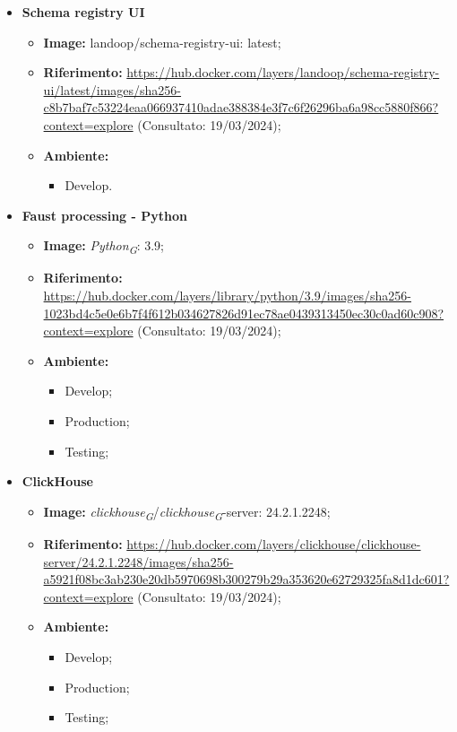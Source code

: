 \begin{itemize}
  \item \textbf{Schema registry UI} 
    \begin{itemize}
      \item \textbf{Image:} landoop/schema-registry-ui: latest;
      \item \textbf{Riferimento:} \url{https://hub.docker.com/layers/landoop/schema-registry-ui/latest/images/sha256-c8b7baf7c53224eaa066937410adae388384e3f7c6f26296ba6a98cc5880f866?context=explore} (Consultato: 19/03/2024);
      \item \textbf{Ambiente:}
        \begin{itemize}
          \item Develop.
        \end{itemize}
    \end{itemize}

  \item \textbf{Faust processing - Python} 
    \begin{itemize}
      \item \textbf{Image:} \textit{Python}\textsubscript{\textit{G}}: 3.9;
      \item \textbf{Riferimento:} \url{https://hub.docker.com/layers/library/python/3.9/images/sha256-1023bd4c5e0e6b7f4f612b034627826d91ec78ae0439313450ec30c0ad60c908?context=explore} (Consultato: 19/03/2024);
      \item \textbf{Ambiente:}
        \begin{itemize}
          \item Develop;
          \item Production;
          \item Testing;
        \end{itemize}
    \end{itemize}

  \item \textbf{ClickHouse} 
    \begin{itemize}
      \item \textbf{Image:} \textit{clickhouse}\textsubscript{\textit{G}}/\textit{clickhouse}\textsubscript{\textit{G}}-server: 24.2.1.2248;
      \item \textbf{Riferimento:} \url{https://hub.docker.com/layers/clickhouse/clickhouse-server/24.2.1.2248/images/sha256-a5921f08bc3ab230e20db5970698b300279b29a353620e62729325fa8d1dc601?context=explore} (Consultato: 19/03/2024);
      \item \textbf{Ambiente:}
        \begin{itemize}
          \item Develop;
          \item Production;
          \item Testing;
        \end{itemize}
    \end{itemize}


\end{itemize}
